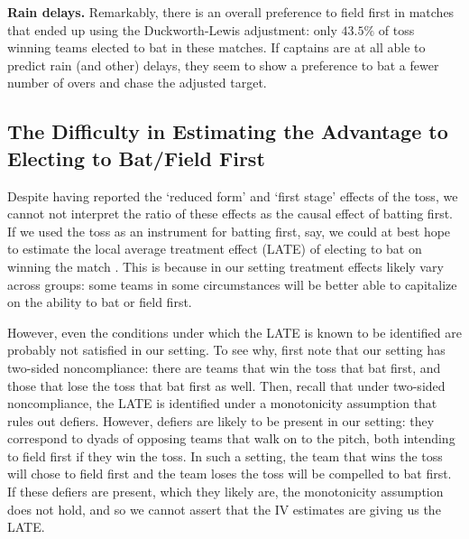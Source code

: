 \documentclass[11pt,  letterpaper]{article}
\begin{document}
\textbf{Rain delays.} Remarkably, there is an overall preference to field first in matches that ended up using the Duckworth-Lewis adjustment: only $43.5\%$ of toss winning teams elected to bat in these matches. If captains are at all able to predict rain (and other) delays, they seem to show a preference to bat a fewer number of overs and chase the adjusted target. 

\subsection{The Difficulty in Estimating the Advantage to Electing to Bat/Field First}

Despite having reported the `reduced form' and `first stage' effects of the toss, we cannot not interpret the ratio of these effects as the causal effect of batting first. If we used the toss as an instrument for batting first, say, we could at best hope to estimate the local average treatment effect (LATE) of electing to bat on winning the match \citep{angrist1996identification}. This is because in our setting  treatment effects likely vary across groups: some teams in some circumstances will be better able to capitalize on the ability to bat or field first.  

However, even the conditions under which the LATE is known to be identified are probably not satisfied in our setting. To see why, first note that our setting has two-sided noncompliance: there are teams that win the toss that bat first, and those that lose the toss that bat first as well. Then, recall that under two-sided noncompliance, the LATE is identified under a monotonicity assumption that rules out defiers. However, defiers are likely to be present in our setting: they correspond to dyads of opposing teams that walk on to the pitch, both intending to field first if they win the toss. In such a setting, the team that wins the toss will chose to field first and the team loses the toss will be compelled to bat first. If these defiers are present, which they likely are, the monotonicity assumption does not hold, and so we cannot assert that the IV estimates are giving us the LATE.
\end{document}
